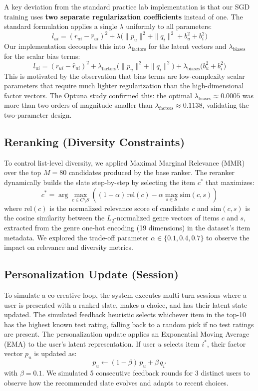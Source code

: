 \documentclass[11pt]{article}
\begin{document}
\noindent A key deviation from the standard practice lab implementation is that our SGD training uses \textbf{two separate regularization coefficients} instead of one. The standard formulation applies a single $\lambda$ uniformly to all parameters:
$$l_{ui} = (r_{ui} - \hat{r}_{ui})^2 + \lambda\bigl(\|p_u\|^2 + \|q_i\|^2 + b_u^2 + b_i^2\bigr)$$
\noindent Our implementation decouples this into $\lambda_{\text{factors}}$ for the latent vectors and $\lambda_{\text{biases}}$ for the scalar bias terms:
$$l_{ui} = (r_{ui} - \hat{r}_{ui})^2 + \lambda_{\text{factors}}\bigl(\|p_u\|^2 + \|q_i\|^2\bigr) + \lambda_{\text{biases}}\bigl(b_u^2 + b_i^2\bigr)$$
\noindent This is motivated by the observation that bias terms are low-complexity scalar parameters that require much lighter regularization than the high-dimensional factor vectors. The Optuna study confirmed this: the optimal $\lambda_{\text{biases}} \approx 0.0005$ was more than two orders of magnitude smaller than $\lambda_{\text{factors}} \approx 0.1138$, validating the two-parameter design.

\subsection{Reranking (Diversity Constraints)}

\noindent To control list-level diversity, we applied Maximal Marginal Relevance (MMR) over the top $M = 80$ candidates produced by the base ranker. The reranker dynamically builds the slate step-by-step by selecting the item $c^*$ that maximizes:
$$c^* = \arg\max_{c \in C \setminus S} \left( (1 - \alpha)\,\text{rel}(c) - \alpha \max_{s \in S}\text{sim}(c, s) \right)$$
\noindent where $\text{rel}(c)$ is the normalized relevance score of candidate $c$ and $\text{sim}(c, s)$ is the cosine similarity between the $L_2$-normalized genre vectors of items $c$ and $s$, extracted from the genre one-hot encoding (19 dimensions) in the dataset's item metadata. We explored the trade-off parameter $\alpha \in \{0.1, 0.4, 0.7\}$ to observe the impact on relevance and diversity metrics.

\subsection{Personalization Update (Session)}

\noindent To simulate a co-creative loop, the system executes multi-turn sessions where a user is presented with a ranked slate, makes a choice, and has their latent state updated. The simulated feedback heuristic selects whichever item in the top-10 has the highest known test rating, falling back to a random pick if no test ratings are present. The personalization update applies an Exponential Moving Average (EMA) to the user's latent representation. If user $u$ selects item $i^*$, their factor vector $p_u$ is updated as:
$$p_u \leftarrow (1 - \beta)\,p_u + \beta\, q_{i^*}$$
\noindent with $\beta = 0.1$. We simulated 5 consecutive feedback rounds for 3 distinct users to observe how the recommended slate evolves and adapts to recent choices.
\end{document}
